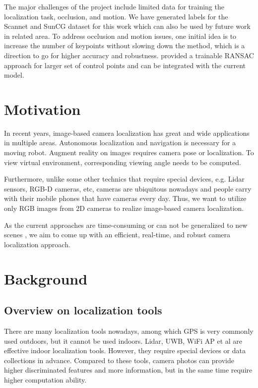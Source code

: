 The major challenges of the project include limited data for training the localization task, occlusion, and motion. We have generated labels for the Scannet and SunCG dataset for this work which can also be used by future work in related area. To address occlusion and motion issues, one initial idea is to increase the number of keypoints without slowing down the method, which is a direction to go for higher accuracy and robustness. \cite{brachmann2017dsac} provided a trainable RANSAC approach for larger set of control points and can be integrated with the current model.


\section{Motivation}

In recent years, image-based camera localization has great and wide applications in multiple areas. Autonomous localization and navigation is necessary for a moving robot. Augment reality on images requires camera pose or localization. To view virtual environment, corresponding viewing angle needs to be computed.

Furthermore, unlike some other technics that require special devices, e.g. Lidar sensors, RGB-D cameras, etc, cameras are ubiquitous nowadays and people carry with their mobile phones that have cameras every day. Thus, we want to utilize only RGB images from 2D cameras to realize image-based camera localization.

As the current approaches are time-consuming \cite{brachmann2017dsac} or can not be generalized to new scenes \cite{wu2017delving}, we aim to come up with an efficient, real-time, and robust camera localization approach.


\section{Background}

\subsection{Overview on localization tools}

There are many localization tools nowadays, among which GPS is very commonly used outdoors, but it cannot be used indoors. Lidar, UWB, WiFi AP et al are effective indoor localization tools. However, they require special devices or data collections in advance. Compared to these tools, camera photos can provide higher discriminated features and more information, but in the same time require higher computation ability.

